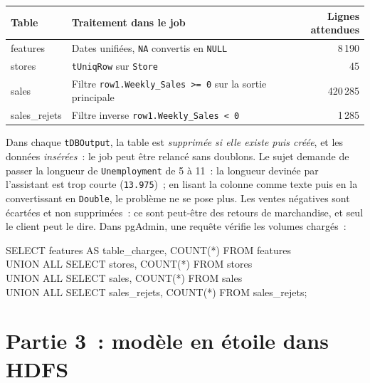 \begin{center}
\small
\begin{tabularx}{\textwidth}{>{\ttfamily}l >{\raggedright\arraybackslash}X r}
\toprule
\normalfont\textbf{Table} & \textbf{Traitement dans le job} & \textbf{Lignes attendues} \\
\midrule
features & Dates unifiées, \texttt{NA} convertis en \texttt{NULL} & 8\,190 \\
stores & \texttt{tUniqRow} sur \texttt{Store} & 45 \\
sales & Filtre \texttt{row1.Weekly\_Sales >= 0} sur la sortie principale & 420\,285 \\
sales\_rejets & Filtre inverse \texttt{row1.Weekly\_Sales < 0} & 1\,285 \\
\bottomrule
\end{tabularx}
\end{center}

\noindent Dans chaque \texttt{tDBOutput}, la table est \textit{supprimée si elle existe puis créée}, et les données \textit{insérées}~: le job peut être relancé sans doublons. Le sujet demande de passer la longueur de \texttt{Unemployment} de 5 à 11~: la longueur devinée par l'assistant est trop courte (\texttt{13.975})~; en lisant la colonne comme texte puis en la convertissant en \texttt{Double}, le problème ne se pose plus. Les ventes négatives sont écartées et non supprimées~: ce sont peut-être des retours de marchandise, et seul le client peut le dire. Dans pgAdmin, une requête vérifie les volumes chargés~:

\begin{code}
SELECT \textquotesingle{}features\textquotesingle{} AS table\_chargee, COUNT(*) FROM features\\
UNION ALL SELECT \textquotesingle{}stores\textquotesingle{}, COUNT(*) FROM stores\\
UNION ALL SELECT \textquotesingle{}sales\textquotesingle{}, COUNT(*) FROM sales\\
UNION ALL SELECT \textquotesingle{}sales\_rejets\textquotesingle{}, COUNT(*) FROM sales\_rejets;
\end{code}

\newpage
\section*{Partie 3~: modèle en étoile dans HDFS}
{}

